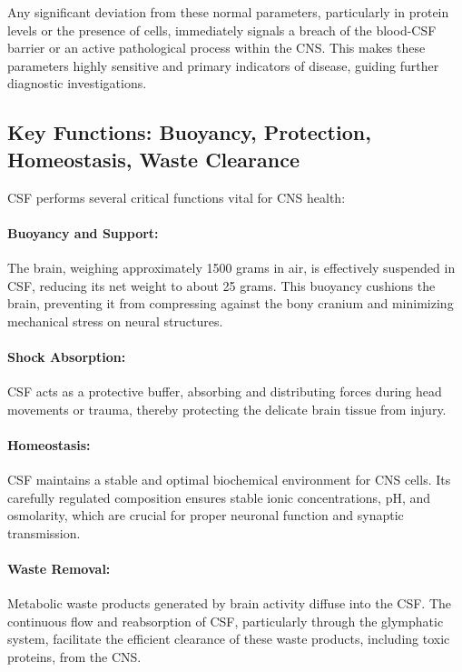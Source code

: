 Any significant deviation from these normal parameters, particularly in protein levels or the presence of cells, immediately signals a breach of the blood-CSF barrier or an active pathological process within the CNS. This makes these parameters highly sensitive and primary indicators of disease, guiding further diagnostic investigations.
	
\subsection{Key Functions: Buoyancy, Protection, Homeostasis, Waste Clearance}
	
CSF performs several critical functions vital for CNS health:
	
\paragraph{Buoyancy and Support:} The brain, weighing approximately 1500 grams in air, is effectively suspended in CSF, reducing its net weight to about 25 grams. This buoyancy cushions the brain, preventing it from compressing against the bony cranium and minimizing mechanical stress on neural structures.
	
\paragraph{Shock Absorption:} CSF acts as a protective buffer, absorbing and distributing forces during head movements or trauma, thereby protecting the delicate brain tissue from injury.
	
\paragraph{Homeostasis:} CSF maintains a stable and optimal biochemical environment for CNS cells. Its carefully regulated composition ensures stable ionic concentrations, pH, and osmolarity, which are crucial for proper neuronal function and synaptic transmission.
	
\paragraph{Waste Removal:} Metabolic waste products generated by brain activity diffuse into the CSF. The continuous flow and reabsorption of CSF, particularly through the glymphatic system, facilitate the efficient clearance of these waste products, including toxic proteins, from the CNS.
	
